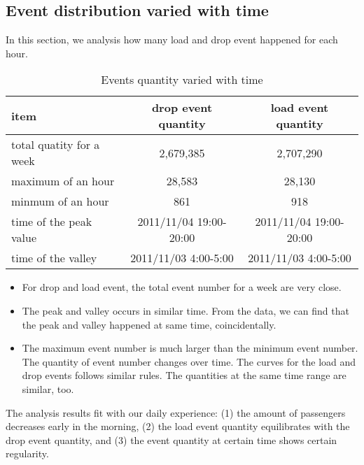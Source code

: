 \subsection{Event distribution varied with time}

In this section, we analysis how many load and drop event happened for each hour.  
\begin{table}[!h]
\caption{Events quantity varied with time}\label{table_event_distribution_with_time}
\centering
\begin{tabular}{l|c|c}
 item &drop event quantity &load event quantity \\
  \hline
  total quatity for a week& 2,679,385&2,707,290\\
  maximum of an hour&28,583 &28,130\\
  minmum of an hour&861&918\\
  time of the peak value&2011/11/04 19:00-20:00&2011/11/04 19:00-20:00\\
  time of the valley&2011/11/03 4:00-5:00&2011/11/03 4:00-5:00
  \end{tabular}
\end{table}

\begin{itemize}
  \item For drop and load event, the total event number for a week are very close. \\
  \item The peak and valley occurs in similar time. From the data, we can find that the peak and valley happened at same time, coincidentally.
  \item The maximum event number is much larger than the minimum event number. The quantity of event number changes over time. The curves for the load and drop events follows similar rules. The quantities at the same time range are similar, too.
\end{itemize}

The analysis results fit with our daily experience: (1) the amount of passengers decreases early in the morning, (2) the load event quantity equilibrates with the drop event quantity, and (3) the event quantity at certain time shows certain regularity. 


